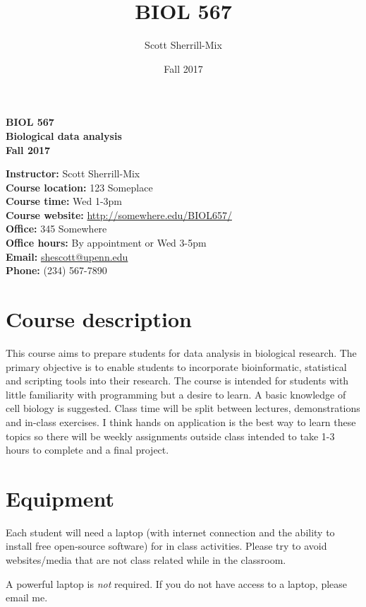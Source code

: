 \documentclass[12pt]{article}
\title{BIOL 567}
\date{Fall 2017}
\author{Scott Sherrill-Mix}
\begin{document}
\thispagestyle{plain}
\begin{center}
\Large{\textbf{BIOL 567\\ Biological data analysis}}\\
\Large{\textbf{Fall 2017}}
\end{center}

\noindent
\textbf{Instructor:} Scott Sherrill-Mix\\
\textbf{Course location:} 123 Someplace\\
\textbf{Course time:} Wed 1-3pm\\
\textbf{Course website:} \url{http://somewhere.edu/BIOL657/}\\

\noindent
\textbf{Office:} 345 Somewhere\\
\textbf{Office hours:} By appointment or Wed 3-5pm\\
\textbf{Email:} \href{mailto:shescott@upenn.edu}{shescott@upenn.edu}\\
\textbf{Phone:} (234) 567-7890

\section*{Course description}
This course aims to prepare students for data analysis in biological research. The primary objective is to enable students to incorporate bioinformatic, statistical and scripting tools into their research. The course is intended for students with little familiarity with programming but a desire to learn. A basic knowledge of cell biology is suggested. Class time will be split between lectures, demonstrations and in-class exercises. I think hands on application is the best way to learn these topics so there will be weekly assignments outside class intended to take 1-3 hours to complete and a final project. 

\section*{Equipment}
Each student will need a laptop (with internet connection and the ability to install free open-source software) for in class activities. Please try to avoid websites/media that are not class related while in the classroom.

A powerful laptop is \emph{not} required.  If you do not have access to a laptop, please email me.
\end{document}
